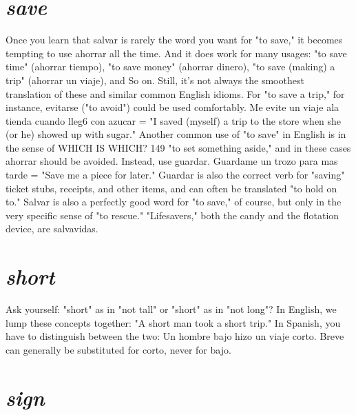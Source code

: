 \documentclass[14pt,a4paper,oneside]{memoir}
\begin{document}
\section{\emph{save}}

Once you learn that salvar is rarely the word you want for "to
save," it becomes tempting to use ahorrar all the time. And it does
work for many usages: "to save time" (ahorrar tiempo), "to save
money" (ahorrar dinero), "to save (making) a trip" (ahorrar un viaje),
and So on. Still, it's not always the smoothest translation of these and
similar common English idioms. For "to save a trip," for instance, evitarse ("to avoid") could be used comfortably. Me evite un viaje ala
tienda cuando lleg6 con azucar = "I saved (myself) a trip to the store
when she (or he) showed up with sugar."
Another common use of "to save" in English is in the sense of
WHICH IS WHICH? 149
"to set something aside," and in these cases ahorrar should be avoided.
Instead, use guardar. Guardame un trozo para mas tarde = "Save me
a piece for later." Guardar is also the correct verb for "saving" ticket
stubs, receipts, and other items, and can often be translated "to hold
on to." Salvar is also a perfectly good word for "to save," of course, but
only in the very specific sense of "to rescue." "Lifesavers," both the
candy and the flotation device, are salvavidas.

\section{\emph{short}}

Ask yourself: "short" as in "not tall" or "short" as in "not
long"? In English, we lump these concepts together: "A short man
took a short trip." In Spanish, you have to distinguish between the
two: Un hombre bajo hizo un viaje corto. Breve can generally be substituted for corto, never for bajo.

\section{\emph{sign}}
\end{document}
